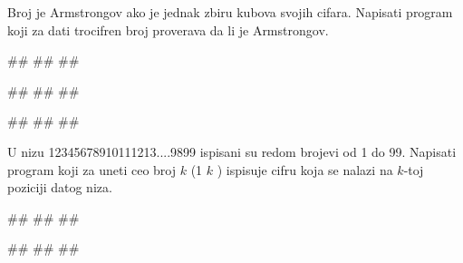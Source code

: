 \begin{Exercise}[label=p1.2_02] 
Broj je Armstrongov ako je jednak zbiru kubova svojih cifara. Napisati program koji za dati trocifren broj proverava da li je Armstrongov.

\begin{miditest}
\begin{upotreba}{1}
#\naslovInt#
##
##
\end{upotreba}
\end{miditest}
\begin{miditest}
\begin{upotreba}{2}
#\naslovInt#
##
##
\end{upotreba}
\end{miditest}

\begin{miditest}
\begin{upotreba}{3}
#\naslovInt#
##
##
\end{upotreba}
\end{miditest}

\end{Exercise}
\begin{Answer}[ref=p1.2_02]
\end{Answer}

\begin{Exercise}[label=p1.2_03] 
 U nizu 12345678910111213....9899 ispisani su redom brojevi od 1 do 99. Napisati program koji za uneti  ceo broj $k$ (1 \geq $k$ ) ispisuje cifru koja se nalazi na $k$-toj poziciji datog niza.
 
\begin{miditest}
\begin{upotreba}{1}
#\naslovInt#
##
##
\end{upotreba}
\end{miditest}
\begin{miditest}
\begin{upotreba}{2}
#\naslovInt#
##
##
\end{upotreba}
\end{miditest}

\end{Exercise}
\begin{Answer}[ref=p1.2_03]
\end{Answer}

